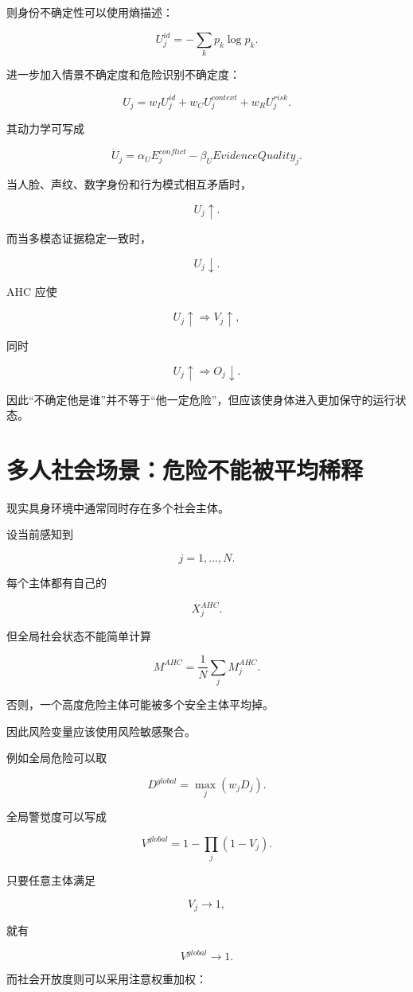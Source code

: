 则身份不确定性可以使用熵描述：

\[
U_j^{id}
=
-\sum_k
p_k
\log p_k.
\]

进一步加入情景不确定度和危险识别不确定度：

\[
U_j
=
w_IU_j^{id}
+
w_CU_j^{context}
+
w_RU_j^{risk}.
\]

其动力学可写成

\[
\boxed{
\dot U_j
=
\alpha_U
E_j^{conflict}
-
\beta_U
EvidenceQuality_j.
}
\]

当人脸、声纹、数字身份和行为模式相互矛盾时，

\[
U_j\uparrow.
\]

而当多模态证据稳定一致时，

\[
U_j\downarrow.
\]

AHC 应使

\[
U_j\uparrow
\Rightarrow
V_j\uparrow,
\]

同时

\[
U_j\uparrow
\Rightarrow
O_j\downarrow.
\]

因此“不确定他是谁”并不等于“他一定危险”，但应该使身体进入更加保守的运行状态。


\section{多人社会场景：危险不能被平均稀释}

现实具身环境中通常同时存在多个社会主体。

设当前感知到

\[
j=1,\ldots,N.
\]

每个主体都有自己的

\[
X_j^{AHC}.
\]

但全局社会状态不能简单计算

\[
M^{AHC}
=
\frac{1}{N}
\sum_j
M_j^{AHC}.
\]

否则，一个高度危险主体可能被多个安全主体平均掉。

因此风险变量应该使用风险敏感聚合。

例如全局危险可以取

\[
D^{global}
=
\max_j
\left(
w_jD_j
\right).
\]

全局警觉度可以写成

\[
\boxed{
V^{global}
=
1-
\prod_j
(1-V_j).
}
\]

只要任意主体满足

\[
V_j\rightarrow1,
\]

就有

\[
V^{global}\rightarrow1.
\]

而社会开放度则可以采用注意权重加权：

